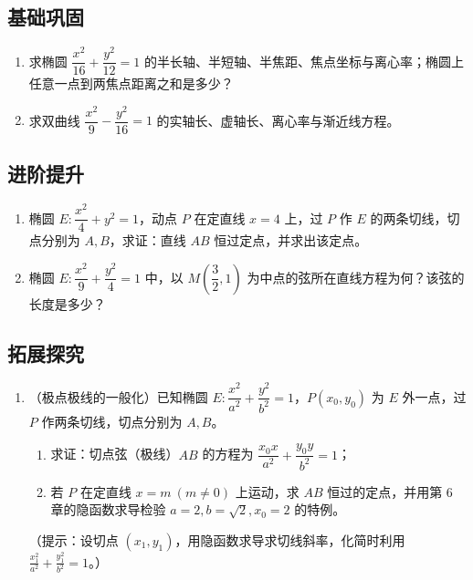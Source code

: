 \begin{afterclass}
\subsection*{基础巩固}
\begin{enumerate}
  \item 求椭圆 $\dfrac{x^2}{16}+\dfrac{y^2}{12}=1$ 的半长轴、半短轴、半焦距、焦点坐标与离心率；椭圆上任意一点到两焦点距离之和是多少？
  \item 求双曲线 $\dfrac{x^2}{9}-\dfrac{y^2}{16}=1$ 的实轴长、虚轴长、离心率与渐近线方程。
\end{enumerate}

\subsection*{进阶提升}
\begin{enumerate}
  \item 椭圆 $E:\dfrac{x^2}{4}+y^2=1$，动点 $P$ 在定直线 $x=4$ 上，过 $P$ 作 $E$ 的两条切线，切点分别为 $A,B$，求证：直线 $AB$ 恒过定点，并求出该定点。
  \item 椭圆 $E:\dfrac{x^2}{9}+\dfrac{y^2}{4}=1$ 中，以 $M\left(\dfrac32,1\right)$ 为中点的弦所在直线方程为何？该弦的长度是多少？
\end{enumerate}

\subsection*{拓展探究}
\begin{enumerate}
  \item （极点极线的一般化）已知椭圆 $E:\dfrac{x^2}{a^2}+\dfrac{y^2}{b^2}=1$，$P(x_0,y_0)$ 为 $E$ 外一点，过 $P$ 作两条切线，切点分别为 $A,B$。
  \begin{enumerate}
    \item 求证：切点弦（极线）$AB$ 的方程为 $\dfrac{x_0x}{a^2}+\dfrac{y_0y}{b^2}=1$；
    \item 若 $P$ 在定直线 $x=m\ (m\neq0)$ 上运动，求 $AB$ 恒过的定点，并用第 6 章的隐函数求导检验 $a=2,b=\sqrt2,x_0=2$ 的特例。
  \end{enumerate}
  （提示：设切点 $(x_1,y_1)$，用隐函数求导求切线斜率，化简时利用 $\frac{x_1^2}{a^2}+\frac{y_1^2}{b^2}=1$。）
\end{enumerate}


\end{afterclass}
